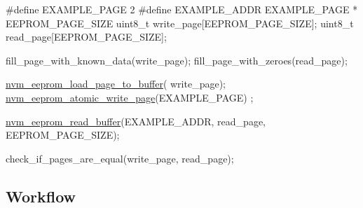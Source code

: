 \begin{DoxyCode}
\textcolor{preprocessor}{         #define EXAMPLE\_PAGE 2}
\textcolor{preprocessor}{}\textcolor{preprocessor}{         #define EXAMPLE\_ADDR EXAMPLE\_PAGE * EEPROM\_PAGE\_SIZE}
\textcolor{preprocessor}{}
         uint8\_t write\_page[EEPROM\_PAGE\_SIZE];
         uint8\_t read\_page[EEPROM\_PAGE\_SIZE];

         fill\_page\_with\_known\_data(write\_page);
         fill\_page\_with\_zeroes(read\_page);

         \hyperlink{group__nvm__eeprom__group_ga02f10adbf959b8525bbaf777ad6e43b6}{nvm\_eeprom\_load\_page\_to\_buffer}(
      write\_page);
         \hyperlink{group__nvm__eeprom__group_ga6f939f98287b320d39418ed72ba8cfe1}{nvm\_eeprom\_atomic\_write\_page}(EXAMPLE\_PAGE)
      ;

         \hyperlink{group__nvm__eeprom__group_ga723a1c1ef60ffb4d220f28c99e6c3014}{nvm\_eeprom\_read\_buffer}(EXAMPLE\_ADDR,
                 read\_page, EEPROM\_PAGE\_SIZE);

         check\_if\_pages\_are\_equal(write\_page, read\_page);
\end{DoxyCode}
\hypertarget{xmega_nvm_quickstart_nvm_quickstart_eeprom_case_workflow}{}\subsection{Workflow}\label{xmega_nvm_quickstart_nvm_quickstart_eeprom_case_workflow}

